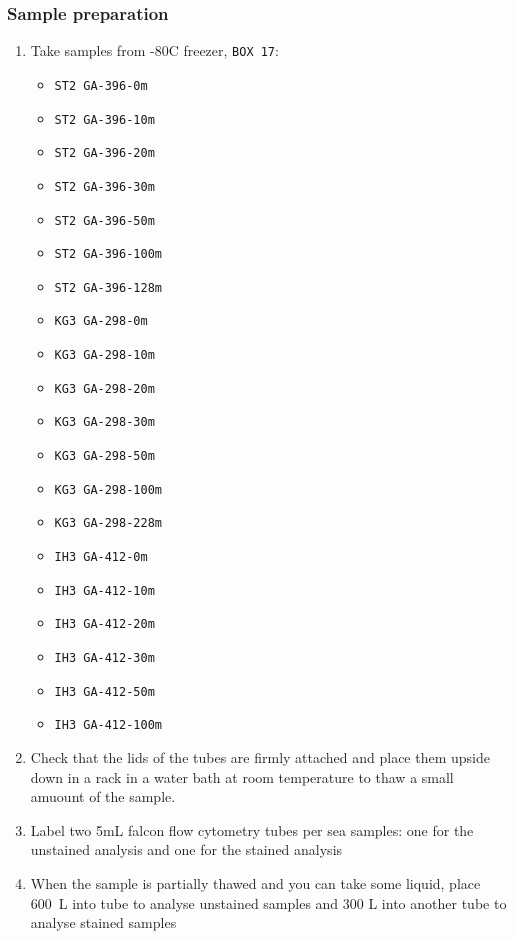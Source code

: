 \subsubsection{Sample preparation}
\begin{enumerate}
\item Take samples from -80\degree C freezer, \texttt{BOX 17}:
	\begin{itemize}
	\item[] \texttt{ST2 GA-396-0m}
	\item[] \texttt{ST2 GA-396-10m}
	\item[] \texttt{ST2 GA-396-20m}
	\item[] \texttt{ST2 GA-396-30m}
	\item[] \texttt{ST2 GA-396-50m}
	\item[] \texttt{ST2 GA-396-100m}
	\item[] \texttt{ST2 GA-396-128m}
	\\
	\item[] \texttt{KG3 GA-298-0m}
	\item[] \texttt{KG3 GA-298-10m}
	\item[] \texttt{KG3 GA-298-20m}
	\item[] \texttt{KG3 GA-298-30m}
	\item[] \texttt{KG3 GA-298-50m}
	\item[] \texttt{KG3 GA-298-100m}
	\item[] \texttt{KG3 GA-298-228m}
	\\
	\item[] \texttt{IH3 GA-412-0m}
	\item[] \texttt{IH3 GA-412-10m}
	\item[] \texttt{IH3 GA-412-20m}
	\item[] \texttt{IH3 GA-412-30m}
	\item[] \texttt{IH3 GA-412-50m}
	\item[] \texttt{IH3 GA-412-100m}
	\end{itemize}
\item Check that the lids of the tubes are firmly attached and place them upside down in a rack in a water bath at room temperature to thaw a small amuount of the sample. 
\item Label two 5mL falcon flow cytometry tubes per sea samples: one for the unstained analysis and one for the stained analysis
\item When the sample is partially thawed and you can take some liquid, place 600~\textmu L into tube to analyse unstained samples and 300 \textmu L into another tube to analyse stained samples
\end{enumerate}

